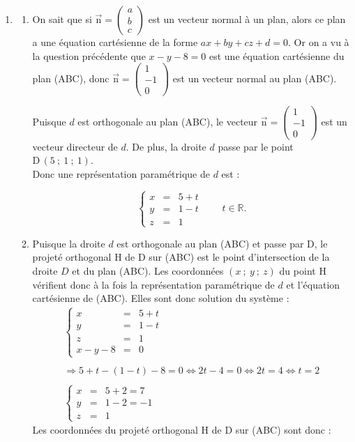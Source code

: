 \documentclass[10pt]{article}
\providecommand{\R}{\mathbb{R}}
\providecommand{\vectt}[1]{\overrightarrow{\mathrm{#1}}}
\begin{document}
\begin{enumerate}
\item
	\begin{enumerate}
		\item On sait que si $\vectt{n} = \begin{pmatrix}a\\b\\c\end{pmatrix}$ est un vecteur normal à un plan, alors ce plan a une équation cartésienne de la forme $ax + by + cz + d = 0$. Or on a vu à la question précédente que $x - y - 8 = 0$ est une équation cartésienne du plan (ABC), donc $\vectt{n} = \begin{pmatrix}1\\-1\\0\end{pmatrix}$ est un vecteur normal au plan (ABC).

Puisque $d$ est orthogonale au plan (ABC), le vecteur $\vectt{n} = \begin{pmatrix}1\\-1\\0\end{pmatrix}$ est un vecteur directeur de $d$. De plus, la droite $d$ passe par le point $\mathrm{D}\,(5~;~1~;~1)$. \\
Donc une représentation paramétrique de $d$ est :

\[\boxed{\left\{
\begin{array}{rcl}
x &=& 5 + t\\
y &=& 1 - t\\
z &=& 1
\end{array}\right. \qquad t \in \R.}\]

		\item Puisque la droite $d$ est orthogonale au plan (ABC) et passe par D, le projeté orthogonal H de D sur (ABC) est le point d'intersection de la droite $D$ et du plan (ABC). Les coordonnées $(x~;~y~;~z)$ du point H vérifient donc à la fois la représentation paramétrique de $d$ et l'équation cartésienne de (ABC). Elles sont donc solution du système :
		\[\begin{array}{l}
\left\{
\begin{array}{rcl}
x &=& 5 + t\\
y &=& 1 - t\\
z &=& 1\\
x - y - 8 &=& 0
\end{array}\right.\\
\\
\Longrightarrow 5 + t - (1 - t) - 8 = 0 \iff 2t - 4 = 0 \iff 2t = 4 \iff t = 2\\
\\
\left\{
\begin{array}{rcl}
x &=& 5 + 2 = 7\\
y &=& 1 - 2 = -1\\
z &=& 1
\end{array}\right.\end{array}\]
Les coordonnées du projeté orthogonal H de D sur (ABC) sont donc :


\end{enumerate}
\end{enumerate}
\end{document}
